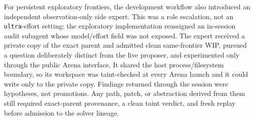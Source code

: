 \documentclass[11pt]{article}
\theoremstyle{definition}
\theoremstyle{remark}
\begin{document}
For persistent exploratory frontiers, the development workflow also introduced an independent
observation-only side expert. This was a role escalation, not an
\texttt{ultra}-effort setting: the exploratory implementation reassigned an in-session
audit subagent whose model/effort field was not exposed. The expert received a private
copy of the exact parent and admitted clean same-frontier WIP, pursued a question
deliberately distinct from the live proposer, and experimented only through the public
Arena interface. It shared the host process/filesystem boundary, so its workspace was
taint-checked at every Arena launch and it could write only to the private copy.
Findings returned through the session were hypotheses, not promotions. Any path, patch,
or abstraction derived from them still required exact-parent provenance, a clean taint
verdict, and fresh replay before admission to the solver lineage.
\end{document}

